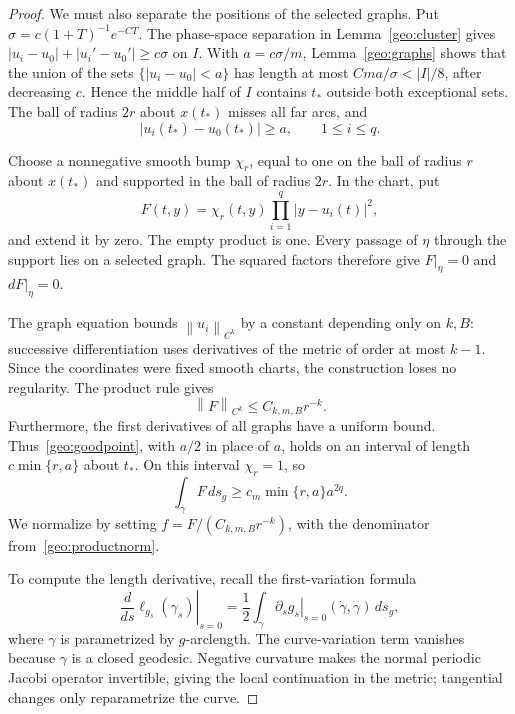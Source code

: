 \documentclass[10pt,oneside,reqno]{amsproc}
\numberwithin{equation}{section}
\theoremstyle{definition}
\theoremstyle{remark}
\newcommand{\norm}[1]{\left\|#1\right\|}
\renewcommand{\ge}{\geqslant}
\renewcommand{\le}{\leqslant}
\begin{document}
\begin{proof}
We must also separate the positions of the selected graphs. Put $\sigma=c(1+T)^{-1}e^{-CT}$. The phase-space separation in Lemma~\ref{geo:cluster} gives $|u_i-u_0|+|u_i'-u_0'|\ge c\sigma$ on $I$. With $a=c\sigma/m$, Lemma~\ref{geo:graphs} shows that the union of the sets $\{|u_i-u_0|<a\}$ has length at most $Cma/\sigma<|I|/8$, after decreasing $c$. Hence the middle half of $I$ contains $t_*$ outside both exceptional sets. The ball of radius $2r$ about $x(t_*)$ misses all far arcs, and
\begin{equation}
 |u_i(t_*)-u_0(t_*)|\ge a,\qquad 1\le i\le q.
 \label{geo:goodpoint}
\end{equation}

Choose a nonnegative smooth bump $\chi_r$, equal to one on the ball of radius $r$ about $x(t_*)$ and supported in the ball of radius $2r$. In the chart, put
\begin{equation}
 F(t,y)=\chi_r(t,y)\prod_{i=1}^q|y-u_i(t)|^2,
 \label{geo:product}
\end{equation}
and extend it by zero. The empty product is one. Every passage of $\eta$ through the support lies on a selected graph. The squared factors therefore give $F|_\eta=0$ and $dF|_\eta=0$.

The graph equation bounds $\norm{u_i}_{C^k}$ by a constant depending only on $k,B$: successive differentiation uses derivatives of the metric of order at most $k-1$. Since the coordinates were fixed smooth charts, the construction loses no regularity. The product rule gives
\begin{equation}
 \norm{F}_{C^k}\le C_{k,m,B}r^{-k}.
 \label{geo:productnorm}
\end{equation}
Furthermore, the first derivatives of all graphs have a uniform bound. Thus~\eqref{geo:goodpoint}, with $a/2$ in place of $a$, holds on an interval of length $c\min\{r,a\}$ about $t_*$. On this interval $\chi_r=1$, so
\begin{equation}
 \int_\gamma F\,ds_g\ge c_m\min\{r,a\}a^{2q}.
 \label{geo:positiveintegral}
\end{equation}
We normalize by setting $f=F/(C_{k,m,B}r^{-k})$, with the denominator from~\eqref{geo:productnorm}.

To compute the length derivative, recall the first-variation formula
\begin{equation}
 \left.\frac{d}{ds}\ell_{g_s}(\gamma_s)\right|_{s=0}=\frac12\int_\gamma \left.\partial_sg_s\right|_{s=0}(\dot\gamma,\dot\gamma)\,ds_g,
 \label{geo:firstvariation}
\end{equation}
where $\gamma$ is parametrized by $g$-arclength. The curve-variation term vanishes because $\gamma$ is a closed geodesic. Negative curvature makes the normal periodic Jacobi operator invertible, giving the local continuation in the metric; tangential changes only reparametrize the curve.


\end{proof}
\end{document}
